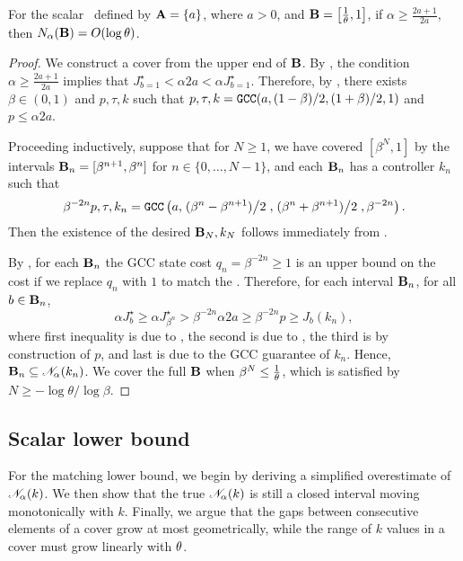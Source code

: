 \begin{theorem}
\label{thm:covering-scalar}
	For the scalar \DDFproblem\ defined by
		$\mathbf{A} = \{ a \}$,
		where $a > 0$,
		and 
		$\mathbf{B} = \left[\textstyle \frac{1}{\theta}, 1 \right]$,
	if $\alpha \geq \frac{2a+1}{2a}$,
	then $N_{\alpha}(\mathbf{B}) = O(\log \theta)$.
\end{theorem}
\begin{proof}
	We construct a cover from the upper end of $\mathbf{B}$.
	By ,
	the condition ${\alpha \geq \frac{2a+1}{2a}}$ implies that
	\(
		J^\star_{b=1} < \alpha 2 a < \alpha J^\star_{b=1}.
	\)
	Therefore, by
	,
	there exists $\beta \in (0, 1)$
	and
	$p, \tau, k$
	such that
	$p, \tau, k = {\normalfont \texttt{GCC}}(a, (1-\beta)/2, (1+\beta)/2, 1)$
	and
	$p \leq \alpha 2a$.

	Proceeding inductively,
	suppose that for $N \geq 1$,
	we have covered $[\beta^N, 1]$
	by the intervals $\mathbf{B}_n = [\beta^{n+1}, \beta^{n}]$
	for $n \in \{0, \dots, N-1\}$,
	and each $\mathbf{B}_n$ has a controller $k_n$ such that 
	\[
		\beta^{-2n}p, \tau, k_n = {\normalfont \texttt{GCC}} \left(
			a,
			\left. (\beta^{n} - \beta^{n+1}) \middle/ 2 \right.,
			\left. (\beta^{n} + \beta^{n+1}) \middle/ 2 \right.,
			\beta^{-2n}
		\right).
	\]
	Then the existence of the desired $\mathbf{B}_N, k_N$
	follows immediately from
	.

	By ,
	for each $\mathbf{B}_n$
	the GCC state cost $q_n = \beta^{-2n} \geq 1$
	is an upper bound on the cost if we replace $q_n$ with $1$
	to match the \DDFproblem.
	Therefore,
	for each interval $\mathbf{B}_n$,
	for all $b \in \mathbf{B}_n$,
	\[
		\alpha J^\star_{b}
		\geq
		\alpha J^\star_{\beta^n}
		>
		\beta^{-2n} \alpha 2 a 
		\geq
		\beta^{-2n} p
		\geq
		J_b(k_n),
	\]
	where first inequality is due to ,
	the second is due to ,
	the third is by construction of $p$,
	and last is due to the GCC guarantee of $k_n$.
	Hence, $\mathbf{B}_n \subseteq \mathscr{N}_{\alpha}(k_n)$.
	We cover the full $\mathbf{B}$ when
	$\beta^{N} \leq \frac{1}{\theta}$,
	which is satisfied by $N \geq - \log \theta / \log \beta$.
\end{proof} 

\subsection{Scalar lower bound}

For the matching lower bound,
we begin by
deriving a simplified overestimate of $\mathscr{N}_{\alpha}(k)$.
We then show that the true $\mathscr{N}_{\alpha}(k)$
is still a closed interval moving monotonically with $k$.
Finally, we argue that
the gaps between consecutive elements of a cover grow at most geometrically,
while the range of $k$ values in a cover must grow linearly with $\theta$.

